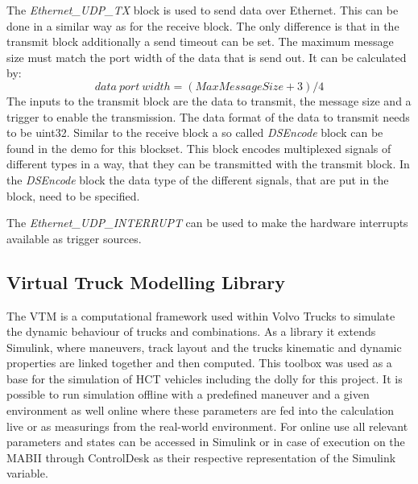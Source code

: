 \documentclass[ExampleMasters.tex]{subfiles}
\begin{document}
The \textit{Ethernet\_UDP\_TX} block is used to send data over Ethernet. This can be done in a similar way as for the receive block. The only difference is that in the transmit block additionally a send timeout can be set. The maximum message size must match the port width of the data that is send out. It can be calculated by:
\begin{equation}
data\ port\ width=(MaxMessageSize + 3) / 4
\end{equation}
The inputs to the transmit block are the data to transmit, the message size and a trigger to enable the transmission. The data format of the data to transmit needs to be uint32. Similar to the receive block a so called \textit{DSEncode} block can be found in the demo for this blockset. This block encodes multiplexed signals of different types in a way, that they can be transmitted with the transmit block. In the \textit{DSEncode} block the data type of the different signals, that are put in the block, need to be specified.

The \textit{Ethernet\_UDP\_INTERRUPT} can be used to make the hardware interrupts available as trigger sources.
\subsection{Virtual Truck Modelling Library}
\label{sec:VTM}
The \gls{VTM} is a computational framework used within Volvo Trucks to simulate the dynamic behaviour of trucks and combinations. As a library it extends Simulink, where maneuvers, track layout and the trucks kinematic and dynamic properties are linked together and then computed. This toolbox was used as a base for the simulation of \gls{HCT} vehicles including the dolly for this project. It is possible to run simulation offline with a predefined maneuver and a given environment as well online where these parameters are fed into the calculation live or as measurings from the real-world environment. For online use all relevant parameters and states can be accessed in Simulink or in case of execution on the \gls{MABII} through ControlDesk as their respective representation of the Simulink variable. 


	
\end{document}
